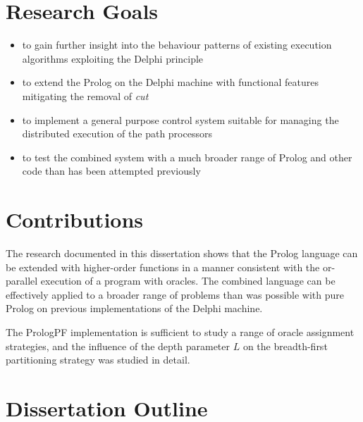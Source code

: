 \section{Research Goals} %

\begin{itemize}
\item{to gain further insight into the behaviour patterns of
  existing execution algorithms exploiting the Delphi principle}
\item{to extend the Prolog on the Delphi machine with functional features
  mitigating the removal of \textit{cut}}
\item{to implement a general purpose control system suitable for
  managing the distributed execution of the path processors}
\item{to test the combined system with a much broader range of
  Prolog and other code than has been attempted previously}
\end{itemize}

\section{Contributions} %

The research documented in this dissertation shows that the Prolog
language can be extended with higher-order functions in a manner
consistent with the or-parallel execution of a program with oracles.
The combined language can be effectively
applied to a broader range of problems than was possible with pure
Prolog on previous implementations of the Delphi machine.

The PrologPF 
implementation is sufficient to study a range of oracle assignment
strategies, and the influence of the depth parameter $L$ on the
breadth-first partitioning strategy was studied in detail.

\section{Dissertation Outline} %


